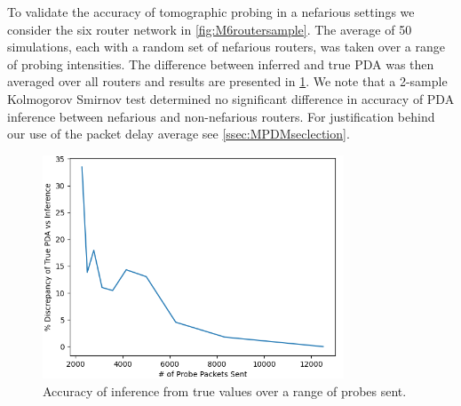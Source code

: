 To validate the accuracy of tomographic probing in a nefarious settings we consider the six router network in \cref{fig:M6routersample}. The average of 50 simulations, each with a random set of nefarious routers, was taken over a range of probing intensities. The difference between inferred and true PDA was then averaged over all routers and results are presented in \cref{fig:MPDAvarprobing}. We note that a 2-sample Kolmogorov Smirnov test determined no significant difference in accuracy of PDA inference between nefarious and non-nefarious routers. For justification behind our use of the packet delay average see \cref{ssec:MPDMseclection}.
\begin{figure}[H]
    \centering
    \includegraphics[width=0.8\textwidth]{figs/results/Probe_PDV_accuracy_plot.png}
    \caption{Accuracy of inference from true values over a range of probes sent.}
    \label{fig:MPDAvarprobing}
\end{figure}

